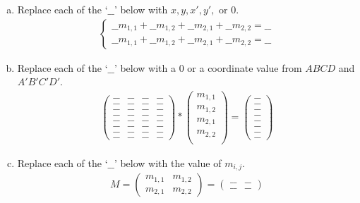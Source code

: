 \begin{enumerate}[(a)]

\item Replace each of the `$\_\_$' below with $x, y, x', y',$ or $0$.
\begin{align}
\begin{cases}
    \_\_m_{1,1} + \_\_m_{1,2} + \_\_m_{2,1} + \_\_m_{2,2} = \_\_ \\
    \_\_m_{1,1} + \_\_m_{1,2} + \_\_m_{2,1} + \_\_m_{2,2} = \_\_
\end{cases}
\end{align}

\item Replace each of the `$\_\_$' below with a $0$ or a coordinate value from $ABCD$ and $A'B'C'D'$.
\begin{align}
    \begin{pmatrix} \_\_ & \_\_ & \_\_ & \_\_ \\ \_\_ & \_\_ & \_\_ & \_\_ \\ \_\_ & \_\_ & \_\_ & \_\_ \\ \_\_ & \_\_ & \_\_ & \_\_ \\ \_\_ & \_\_ & \_\_ & \_\_ \\ \_\_ & \_\_ & \_\_ & \_\_ \\ \_\_ & \_\_ & \_\_ & \_\_ \\ \_\_ & \_\_ & \_\_ & \_\_\end{pmatrix} *\begin{pmatrix} m_{1,1} \\ m_{1,2} \\ m_{2,1} \\ m_{2,2} \\ \end{pmatrix} = \begin{pmatrix} \_\_ \\ \_\_ \\ \_\_ \\ \_\_ \\ \_\_ \\ \_\_ \\ \_\_ \\ \_\_ \end{pmatrix}
\end{align}

\item Replace each of the `$\_\_$' below with the value of $m_{i, j}$.
\begin{align}
    M = \begin{pmatrix} m_{1,1} & m_{1,2} \\ m_{2,1} & m_{2,2} \end{pmatrix} = \begin{pmatrix} \_\_ & \_\_ \\ \_\_ & \_\_ \end{pmatrix}
\end{align}

\end{enumerate}

